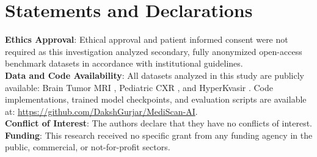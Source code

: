 \documentclass[conference]{IEEEtran}
\begin{document}
\section*{Statements and Declarations}
\textbf{Ethics Approval}: Ethical approval and patient informed consent were not required as this investigation analyzed secondary, fully anonymized open-access benchmark datasets in accordance with institutional guidelines. \\
\textbf{Data and Code Availability}: All datasets analyzed in this study are publicly available: Brain Tumor MRI \cite{afshar2019capsule}, Pediatric CXR \cite{kermany2018identifying}, and HyperKvasir \cite{borgli2020hyperkvasir}. Code implementations, trained model checkpoints, and evaluation scripts are available at: \url{https://github.com/DakshGurjar/MediScan-AI}. \\
\textbf{Conflict of Interest}: The authors declare that they have no conflicts of interest. \\
\textbf{Funding}: This research received no specific grant from any funding agency in the public, commercial, or not-for-profit sectors.
\end{document}
